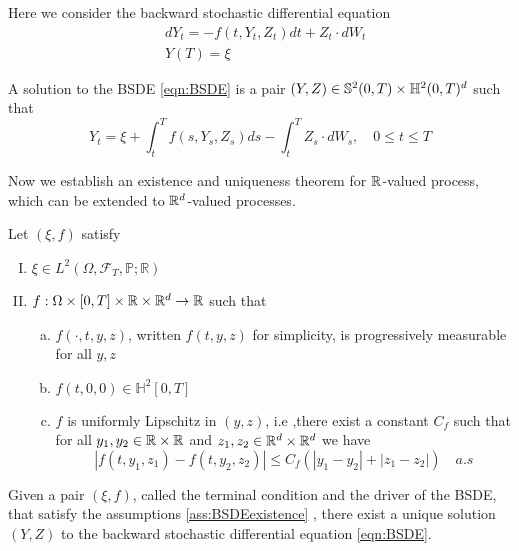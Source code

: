 Here we consider the backward stochastic differential equation 
\begin{equation}
	\label{eqn:BSDE}
	\begin{split}
		&dY_t=-f(t,Y_t,Z_t)dt+Z_t\cdot dW_t\\
		&Y(T)=\xi
	\end{split}
\end{equation}
\begin{definition}
	A solution to the BSDE \eqref{eqn:BSDE} is a pair $(Y,Z)\in \mathbb{S}^2(0,T) \times \mathbb{H}^2(0,T)^d$ such that
	\begin{equation}
	Y_t=\xi+\int_t^T f\left(s, Y_s, Z_s\right) d s-\int_t^T Z_s \cdot d W_s, \quad 0 \leq t \leq T
	\end{equation}
\end{definition}
Now we establish an existence and uniqueness theorem for $\mathbb{R}$-valued process, which can be extended to $\mathbb{R}^d$-valued processes. 
\begin{assumptions}
	\label{ass:BSDEexistence}
	Let $(\xi,f)$ satisfy
	\begin{enumerate}[I.]
		\item $\xi \in L^2(\Omega,\mathcal{F}_T,\mathbb{P};\mathbb{R})$
		\item $f:\Omega\times [0,T]\times\mathbb{R}\times\mathbb{R}^d\to \mathbb{R}$ such that \begin{enumerate}[a)]
			\item $f(\cdot,t,y,z)$, written $f(t,y,z)$ for simplicity, is progressively measurable for all $y,z$
			\item $f(t,0,0)\in \mathbb{H}^2[0,T]$ 
			\item $f$ is uniformly Lipschitz in $(y,z)$, i.e ,there exist a constant $C_f$ such that for all $y_1,y_2\in \mathbb{R}\times \mathbb{R} $ and $z_1,z_2\in \mathbb{R}^d\times\mathbb{R}^d$ we have
			\begin{equation}
				\label{eqn:lipschitz}
				\left|f\left(t, y_1, z_1\right)-f\left(t, y_2, z_2\right)\right| \leq C_f\left(\left|y_1-y_2\right|+\left|z_1-z_2\right|\right) \quad a.s
			\end{equation}
		\end{enumerate}
	\end{enumerate}
\end{assumptions}
\begin{theorem}
	\label{thm:existence}
Given a pair $(\xi,f)$, called the terminal condition and the driver of the BSDE, that satisfy the assumptions \ref{ass:BSDEexistence}
, there exist a unique solution $(Y,Z)$ to the backward stochastic differential equation \eqref{eqn:BSDE}.
\end{theorem}
